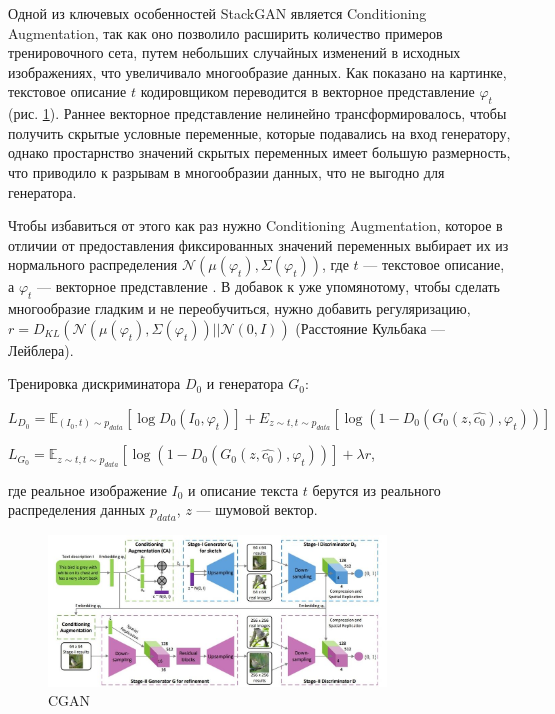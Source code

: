 \documentclass{article}
\renewcommand{\phi}{\varphi}
\theoremstyle{definition}
\theoremstyle{theorem}
\theoremstyle{remark}
\theoremstyle{theorem}
\theoremstyle{example}
\theoremstyle{theorem}
\theoremstyle{theorem}
\theoremstyle{theorem}
\theoremstyle{theorem}
\begin{document}
Одной из ключевых особенностей StackGAN является Conditioning Augmentation, так как оно позволило расширить количество примеров тренировочного сета, путем небольших случайных изменений в исходных изображениях, что увеличивало многообразие данных. Как показано на картинке, текстовое описание $t$ кодировщиком переводится в векторное представление $\phi_t$ (рис. \ref{fig:stackgan}). Раннее векторное представление нелинейно трансформировалось, чтобы получить скрытые условные переменные, которые подавались на вход генератору, однако простарнство значений скрытых переменных имеет большую размерность, что приводило к разрывам в многообразии данных, что не выгодно для генератора. 

Чтобы избавиться от этого как раз нужно Conditioning Augmentation, которое в отличии от предоставления фиксированных значений переменных выбирает их из нормального распределения $\mathcal{N}\left(\mu(\phi_t), \Sigma(\phi_t)\right)$, где $t$ --- текстовое описание, а $\phi_t$ --- векторное представление . В добавок к уже упомянотому, чтобы сделать многообразие гладким и не переобучиться, нужно добавить регуляризацию,$r = D_{KL} \left(\mathcal{N}\left(\mu(\phi_t), \Sigma(\phi_t)\right)||\mathcal{N}\left(0, I\right)\right)$ (Расстояние Кульбака — Лейблера).

Тренировка дискриминатора $D_0$ и генератора $G_0$:

\vspace{0.1cm}

$ L_{D_0} =  \mathbb{E}_{\left(I_0, t\right)\sim p_{data}} \left[\log D_0 \left(I_0,\phi_t\right)\right] + E_{z\sim t, t\sim p_{data}} \left[\log \left(1- D_0\left(G_0(z,\hat{c_0}), \phi_t\right)\right)\right] $

\vspace{0.2cm}

$ L_{G_0} =  \mathbb{E}_{z\sim t, t\sim p_{data}} \left[\log \left(1- D_0\left(G_0(z,\hat{c_0}), \phi_t\right)\right)\right] + \lambda r $,

где реальное изображение $I_0$ и описание текста $t$ берутся из реального распределения данных $p_{data}$, $z$ --- шумовой вектор.

\begin{figure}[!ht]
	\centering
	\includegraphics[width=0.8\textwidth]{img/stackgan.jpg}
	\caption {CGAN}
	\label{fig:stackgan}
\end{figure}
\end{document}
